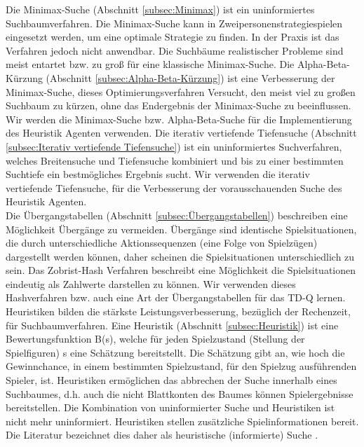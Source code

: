 Die Minimax-Suche (Abschnitt \ref{subsec:Minimax}) ist ein uninformiertes Suchbaumverfahren. Die Minimax-Suche kann in Zweipersonenstrategiespielen eingesetzt werden, um eine optimale Strategie zu finden. In der Praxis ist das Verfahren jedoch nicht anwendbar. Die Suchbäume realistischer Probleme sind meist entartet bzw. zu groß für eine klassische Minimax-Suche. Die Alpha-Beta-Kürzung (Abschnitt \ref{subsec:Alpha-Beta-Kürzung}) ist eine Verbesserung der Minimax-Suche, dieses Optimierungsverfahren Versucht, den meist viel zu großen Suchbaum zu kürzen, ohne das Endergebnis der Minimax-Suche zu beeinflussen. Wir werden die Minimax-Suche bzw. Alpha-Beta-Suche für die Implementierung des Heuristik Agenten verwenden. Die iterativ vertiefende Tiefensuche (Abschnitt \ref{subsec:Iterativ vertiefende Tiefensuche}) ist ein uninformiertes Suchverfahren, welches Breitensuche und Tiefensuche kombiniert und bis zu einer bestimmten Suchtiefe ein bestmögliches Ergebnis sucht. Wir verwenden die iterativ vertiefende Tiefensuche, für die Verbesserung der vorausschauenden Suche des Heuristik Agenten. \\

Die Übergangstabellen (Abschnitt \ref{subsec:Übergangstabellen}) beschreiben eine Möglichkeit Übergänge zu vermeiden. Übergänge sind identische Spielsituationen, die durch unterschiedliche Aktionssequenzen (eine Folge von Spielzügen) dargestellt werden können, daher scheinen die Spielsituationen unterschiedlich zu sein. Das Zobrist-Hash Verfahren beschreibt eine Möglichkeit die Spielsituationen eindeutig als Zahlwerte darstellen zu können. Wir verwenden dieses Hashverfahren bzw. auch eine Art der Übergangstabellen für das TD-Q lernen. \\

Heuristiken bilden die stärkste Leistungsverbesserung, bezüglich der Rechenzeit, für Suchbaumverfahren. Eine Heuristik (Abschnitt \ref{subsec:Heuristik}) ist eine Bewertungsfunktion B(s), welche für jeden Spielzustand (Stellung der Spielfiguren) s eine Schätzung bereitstellt. Die Schätzung gibt an, wie hoch die Gewinnchance, in einem bestimmten Spielzustand, für den Spielzug ausführenden Spieler, ist. Heuristiken ermöglichen das abbrechen der Suche innerhalb eines Suchbaumes, d.h. auch die nicht Blattkonten des Baumes können Spielergebnisse bereitstellen. Die Kombination von uninformierter Suche und Heuristiken ist nicht mehr uninformiert. Heuristiken stellen zusätzliche Spielinformationen bereit. Die Literatur bezeichnet dies daher als heuristische (informierte) Suche \cite[105]{Ertel}. \\

